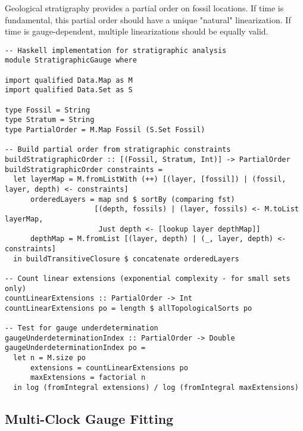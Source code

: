 \documentclass[11pt]{article}
\theoremstyle{definition}
\theoremstyle{plain}
\theoremstyle{remark}
\begin{document}
Geological stratigraphy provides a partial order on fossil locations. If time is fundamental, this partial order should have a unique "natural" linearization. If time is gauge-dependent, multiple linearizations should be equally valid.

\begin{lstlisting}
-- Haskell implementation for stratigraphic analysis
module StratigraphicGauge where

import qualified Data.Map as M
import qualified Data.Set as S

type Fossil = String
type Stratum = String  
type PartialOrder = M.Map Fossil (S.Set Fossil)

-- Build partial order from stratigraphic constraints
buildStratigraphicOrder :: [(Fossil, Stratum, Int)] -> PartialOrder
buildStratigraphicOrder constraints = 
  let layerMap = M.fromListWith (++) [(layer, [fossil]) | (fossil, layer, depth) <- constraints]
      orderedLayers = map snd $ sortBy (comparing fst) 
                     [(depth, fossils) | (layer, fossils) <- M.toList layerMap, 
                      Just depth <- [lookup layer depthMap]]
      depthMap = M.fromList [(layer, depth) | (_, layer, depth) <- constraints]
  in buildTransitiveClosure $ concatenate orderedLayers

-- Count linear extensions (exponential complexity - for small sets only)
countLinearExtensions :: PartialOrder -> Int
countLinearExtensions po = length $ allTopologicalSorts po

-- Test for gauge underdetermination
gaugeUnderdeterminationIndex :: PartialOrder -> Double
gaugeUnderdeterminationIndex po = 
  let n = M.size po
      extensions = countLinearExtensions po
      maxExtensions = factorial n
  in log (fromIntegral extensions) / log (fromIntegral maxExtensions)
\end{lstlisting}

\subsection{Multi-Clock Gauge Fitting}
\end{document}
